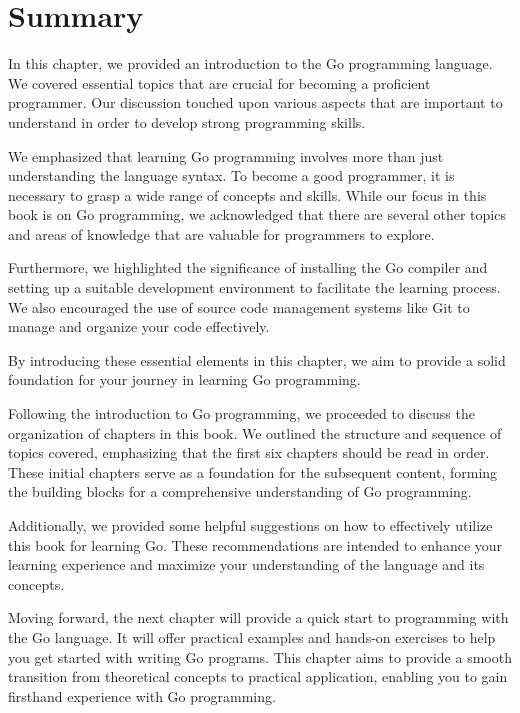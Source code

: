 \section*{Summary}

In this chapter, we provided an introduction to the Go programming language. We
covered essential topics that are crucial for becoming a proficient programmer.
Our discussion touched upon various aspects that are important to understand in
order to develop strong programming skills.

We emphasized that learning Go programming involves more than just understanding
the language syntax. To become a good programmer, it is necessary to grasp a
wide range of concepts and skills. While our focus in this book is on Go
programming, we acknowledged that there are several other topics and areas of
knowledge that are valuable for programmers to explore.

Furthermore, we highlighted the significance of installing the Go compiler and
setting up a suitable development environment to facilitate the learning
process. We also encouraged the use of source code management systems like Git
to manage and organize your code effectively.

By introducing these essential elements in this chapter, we aim to provide a
solid foundation for your journey in learning Go programming.

Following the introduction to Go programming, we proceeded to discuss the
organization of chapters in this book. We outlined the structure and sequence of
topics covered, emphasizing that the first six chapters should be read in order.
These initial chapters serve as a foundation for the subsequent content, forming
the building blocks for a comprehensive understanding of Go programming.

Additionally, we provided some helpful suggestions on how to effectively utilize
this book for learning Go. These recommendations are intended to enhance your
learning experience and maximize your understanding of the language and its
concepts.

Moving forward, the next chapter will provide a quick start to programming with
the Go language. It will offer practical examples and hands-on exercises to help
you get started with writing Go programs. This chapter aims to provide a smooth
transition from theoretical concepts to practical application, enabling you to
gain firsthand experience with Go programming.
